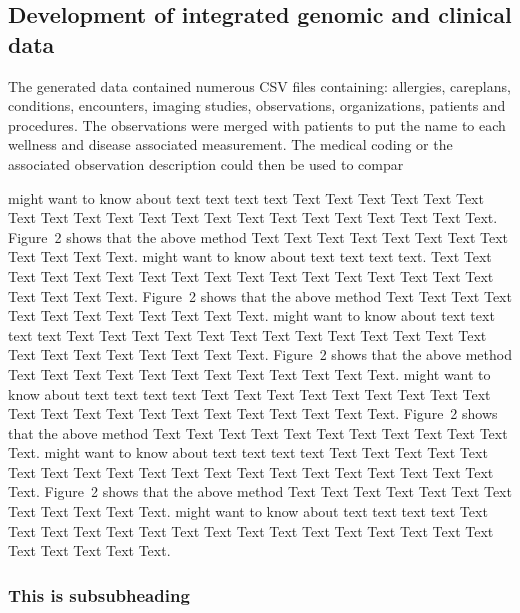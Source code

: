 \documentclass{bioinfo}
\begin{document}
\begin{methods}
\subsection{Development of integrated genomic and clinical data}
The generated data contained numerous CSV files containing: allergies, careplans, conditions, encounters, imaging studies, observations, organizations, patients and procedures. The observations were merged with patients to put the name to each wellness and disease associated measurement. The medical coding or the associated observation description could then be used to compar

\citealp{Boffelli03} might want to know about  text text text text
Text Text Text Text Text Text Text Text Text Text Text Text Text
Text Text  Text Text Text Text Text Text.
Figure~2\vphantom{\ref{fig:02}} shows that the above method  Text
Text Text Text Text Text Text Text Text Text  Text Text.
\citealp{Boffelli03} might want to know about  text text text
text. Text Text Text Text Text Text  Text Text Text Text Text Text
Text Text Text  Text Text Text Text Text Text.
Figure~2\vphantom{\ref{fig:02}} shows that the above method  Text
Text Text Text Text Text Text Text Text Text  Text Text.
\citealp{Boffelli03} might want to know about  text text text text
Text Text Text Text Text Text Text Text Text Text Text Text Text
Text Text  Text Text Text Text Text Text.
Figure~2\vphantom{\ref{fig:02}} shows that the above method  Text
Text Text Text Text Text Text Text Text Text  Text Text.
\citealp{Boffelli03} might want to know about  text text text text
Text Text Text Text Text Text  Text Text Text Text Text Text Text
Text Text  Text Text Text Text Text Text.
Figure~2\vphantom{\ref{fig:02}} shows that the above method  Text
Text Text Text Text Text Text Text Text Text  Text Text.
\citealp{Boffelli03} might want to know about  text text text text
Text Text Text Text Text Text Text Text Text Text Text Text Text
Text Text  Text Text Text Text Text Text.
Figure~2\vphantom{\ref{fig:02}} shows that the above method  Text
Text Text Text Text Text Text Text Text Text  Text Text.
\citealp{Boffelli03} might want to know about  text text text text
Text Text Text Text Text Text  Text Text Text Text Text Text Text
Text Text  Text Text Text Text Text Text.


\subsubsection{This is subsubheading}


\end{methods}
\end{document}
